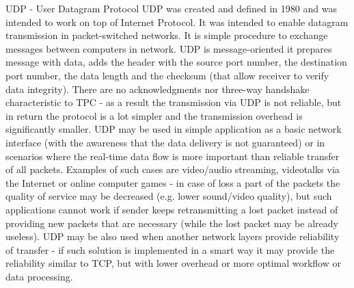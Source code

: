 \documentclass[magisterska,en]{pracamgr}
\begin{document}
UDP - User Datagram Protocol
UDP was created and defined in 1980 and was intended to work on top of Internet Protocol. It was intended to enable datagram transmission in packet-switched networks. It is simple procedure to exchange messages between computers in network. UDP is message-oriented it prepares message with data, adds the header with the source port number, the destination port number, the data length and the checksum (that allow receiver to verify data integrity). There are no acknowledgments nor three-way handshake characteristic to TPC - as a result the transmission via UDP is not reliable, but in return the protocol is a lot simpler and the transmission overhead is significantly smaller. UDP may be used in simple application as a basic network interface (with the awareness that the data delivery is not guaranteed) or in scenarios where the real-time data flow is more important than reliable transfer of all packets. Examples of such cases are video/audio streaming, videotalks via the Internet or online computer games - in case of loss a part of the packets the quality of service may be decreased (e.g. lower sound/video quality), but such applications cannot work if sender keeps retransmitting a lost packet instead of providing new packets that are necessary (while the lost packet may be already useless). UDP may be also used when another network layers provide reliability of transfer - if such solution is implemented in a smart way it may provide the reliability similar to TCP, but with lower overhead or more optimal workflow or data processing.
\end{document}
